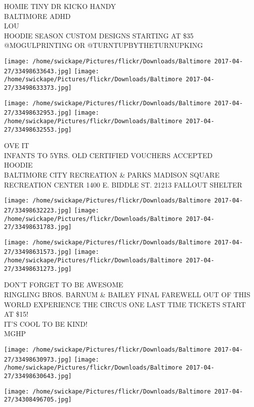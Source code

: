 \documentclass[10pt,letterpaper]{article}
\begin{document}
HOMIE TINY DR  KICKO HANDY\\
BALTIMORE ADHD\\
LOU\\
HOODIE SEASON CUSTOM DESIGNS STARTING AT \$35 @MOGULPRINTING OR @TURNTUPBYTHETURNUPKING\\
\pagebreak

\texttt{[image: /home/swickape/Pictures/flickr/Downloads/Baltimore 2017-04-27/33498633643.jpg]}
\texttt{[image: /home/swickape/Pictures/flickr/Downloads/Baltimore 2017-04-27/33498633373.jpg]}

\texttt{[image: /home/swickape/Pictures/flickr/Downloads/Baltimore 2017-04-27/33498632953.jpg]}
\texttt{[image: /home/swickape/Pictures/flickr/Downloads/Baltimore 2017-04-27/33498632553.jpg]}

OVE IT\\
INFANTS TO 5YRS. OLD CERTIFIED VOUCHERS ACCEPTED\\
HOODIE\\
BALTIMORE CITY RECREATION \& PARKS MADISON SQUARE RECREATION CENTER 1400 E. BIDDLE ST. 21213 FALLOUT SHELTER\\
\pagebreak

\texttt{[image: /home/swickape/Pictures/flickr/Downloads/Baltimore 2017-04-27/33498632223.jpg]}
\texttt{[image: /home/swickape/Pictures/flickr/Downloads/Baltimore 2017-04-27/33498631783.jpg]}

\texttt{[image: /home/swickape/Pictures/flickr/Downloads/Baltimore 2017-04-27/33498631573.jpg]}
\texttt{[image: /home/swickape/Pictures/flickr/Downloads/Baltimore 2017-04-27/33498631273.jpg]}

DON'T FORGET TO BE AWESOME\\
RINGLING BROS. BARNUM \& BAILEY FINAL FAREWELL OUT OF THIS WORLD EXPERIENCE THE CIRCUS ONE LAST TIME TICKETS START AT \$15!\\
IT'S COOL TO BE KIND!\\
MGHP\\
\pagebreak

\texttt{[image: /home/swickape/Pictures/flickr/Downloads/Baltimore 2017-04-27/33498630973.jpg]}
\texttt{[image: /home/swickape/Pictures/flickr/Downloads/Baltimore 2017-04-27/33498630643.jpg]}

\texttt{[image: /home/swickape/Pictures/flickr/Downloads/Baltimore 2017-04-27/34308496705.jpg]}
\end{document}
